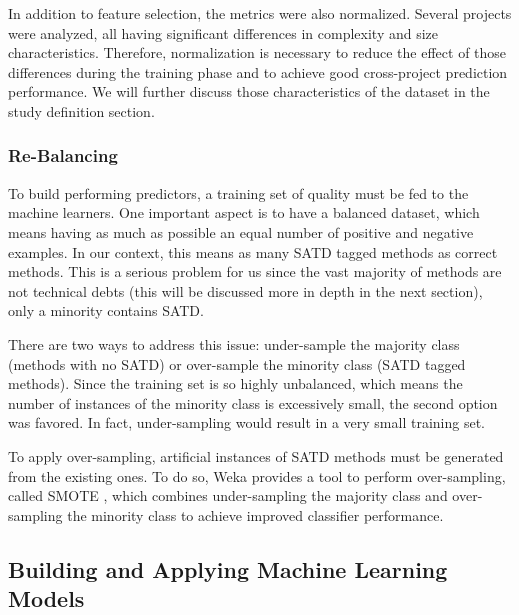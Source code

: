 In addition to feature selection, the metrics were also normalized. Several projects were analyzed, all having significant differences in complexity and size characteristics. Therefore, normalization is necessary to reduce the effect of those differences during the training phase and to achieve good cross-project prediction performance. We will further discuss those characteristics of the dataset in the study definition section.

\subsubsection{Re-Balancing}

To build performing predictors, a training set of quality must be fed to the machine learners. One important aspect is to have a balanced dataset, which means having as much as possible an equal number of positive and negative examples. In our context, this means as many \ac{SATD} tagged methods as correct methods. This is a serious problem for us since the vast majority of methods are not technical debts (this will be discussed more in depth in the next section), only a minority contains \ac{SATD}. 

There are two ways to address this issue: under-sample the majority class (methods with no \ac{SATD}) or over-sample the minority class (\ac{SATD} tagged methods). Since the training set is so highly unbalanced, which means the number of instances of the minority class is excessively small, the second option was favored. In fact, under-sampling would result in a very small training set. 

To apply over-sampling, artificial instances of \ac{SATD} methods must be generated from the existing ones. To do so, Weka provides a tool to perform over-sampling, called \ac{SMOTE} \citep{chawla2002smote}, which combines under-sampling the majority class and over-sampling the minority class to achieve improved classifier performance.

\subsection{Building and Applying Machine Learning Models}

